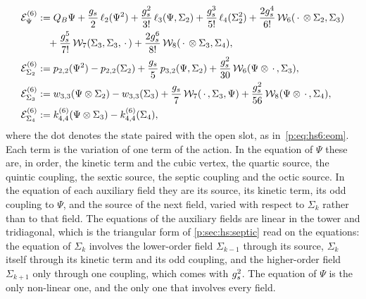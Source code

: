   \begin{subequations}
  \label{p:eq:hs8:eom}
  \begin{align}
    \label{p:eq:hs8:eom-psi}
    \mathcal E^{(6)}_\Psi
      &
      := Q_B \Psi
        + \frac{\gs}{2} \, \ell_2(\Psi^2)
        + \frac{\gs^2}{3!} \, \ell_3(\Psi, \Sigma_2)
        + \frac{\gs^3}{5!} \, \ell_4(\Sigma_2^2)
        + \frac{2 \gs^4}{6!} \, \dvertex{6}(\, \cdot \, \otimes \Sigma_2, \Sigma_3)
    \notag
    \\ &
      \quad
        + \frac{\gs^5}{7!} \, \dvertex{7}(\Sigma_3, \Sigma_3, \, \cdot \,)
        + \frac{2 \gs^6}{8!} \, \dvertex{8}(\, \cdot \, \otimes \Sigma_3, \Sigma_4),
    \\
    \label{p:eq:hs8:eom-sigma2}
    \mathcal E^{(6)}_{\Sigma_2}
      &
      := \sprod{2}{2}(\Psi^2)
        - \sprod{2}{2}(\Sigma_2)
        + \frac{\gs}{5} \, \sprod{3}{2}(\Psi, \Sigma_2)
        + \frac{\gs^2}{30} \, \dvertex{6}(\Psi \otimes \, \cdot \,, \Sigma_3),
    \\
    \label{p:eq:hs8:eom-sigma3}
    \mathcal E^{(6)}_{\Sigma_3}
      &
      := \wprod{3}{3}(\Psi \otimes \Sigma_2)
        - \wprod{3}{3}(\Sigma_3)
        + \frac{\gs}{7} \, \dvertex{7}(\, \cdot \,, \Sigma_3, \Psi)
        + \frac{\gs^2}{56} \, \dvertex{8}(\Psi \otimes \, \cdot \,, \Sigma_4),
    \\
    \label{p:eq:hs8:saddle-4}
    \mathcal E^{(6)}_{\Sigma_4}
      &
      := \kin{4}{}{6}(\Psi \otimes \Sigma_3)
        - \kin{4}{}{6}(\Sigma_4),
  \end{align}
\end{subequations}
  where the dot denotes the state paired with the open slot, as in~\eqref{p:eq:hs6:eom}.
  Each term is the variation of one term of the action.
  In the equation of $\Psi$ these are, in order, the kinetic term and the cubic vertex, the quartic source, the quintic coupling, the sextic source, the septic coupling and the octic source.
  In the equation of each auxiliary field they are its source, its kinetic term, its odd coupling to $\Psi$, and the source of the next field, varied with respect to $\Sigma_k$ rather than to that field.
  The equations of the auxiliary fields are linear in the tower and tridiagonal, which is the triangular form of \cref{p:sec:hs:septic} read on the equations: the equation of $\Sigma_k$ involves the lower-order field $\Sigma_{k - 1}$ through its source, $\Sigma_k$ itself through its kinetic term and its odd coupling, and the higher-order field $\Sigma_{k + 1}$ only through one coupling, which comes with $g_s^2$.
  The equation of $\Psi$ is the only non-linear one, and the only one that involves every field.

